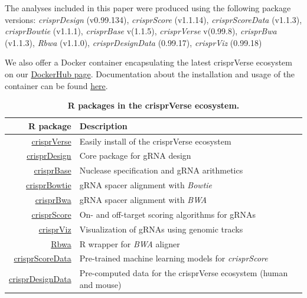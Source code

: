 \documentclass[pdftex,english,10pt]{article}
\begin{document}
{The analyses included in this paper were produced using the following package versions: 
\textit{crisprDesign} (v0.99.134),
\textit{crisprScore} (v1.1.14), 
\textit{crisprScoreData} (v1.1.3), 
\textit{crisprBowtie} (v1.1.1),
\textit{crisprBase} v(1.1.5),
\textit{crisprVerse} v(0.99.8),
\textit{crisprBwa} (v1.1.3), 
\textit{Rbwa} (v1.1.0),
\textit{crisprDesignData} (0.99.17),
\textit{crisprViz} (0.99.18)

We also offer a Docker container encapsulating the latest crisprVerse ecosystem on our \href{https://hub.docker.com/repository/docker/fortin946/crisprverse}{DockerHub page}.
Documentation about the installation and usage of the container can be found \href{https://github.com/crisprVerse/Docker}{here}.



\begin{table}
\centering
\begin{tabular}{r|l}
R package  & Description  \\ \hline
\href{https://github.com/crisprVerse/crisprVerse}{crisprVerse} &  Easily install of the crisprVerse ecosystem  \\
\href{https://github.com/crisprVerse/crisprDesign}{crisprDesign}  &  Core package for gRNA design  \\
\href{https://github.com/crisprVerse/crisprBase}{crisprBase}   &Nuclease specification and gRNA arithmetics  \\
\href{https://github.com/crisprVerse/crisprBowtie}{crisprBowtie}   & gRNA spacer alignment with \textit{Bowtie}  \\
\href{https://github.com/crisprVerse/crisprBwa}{crisprBwa}   &gRNA spacer alignment with \textit{BWA}   \\
\href{https://github.com/crisprVerse/crisprScore}{crisprScore}  & On- and off-target scoring algorithms for gRNAs \\
\href{https://github.com/crisprVerse/crisprViz}{crisprViz} & Visualization of  gRNAs using genomic tracks   \\
\href{https://github.com/crisprVerse/Rbwa}{Rbwa}  &R wrapper for \textit{BWA} aligner \\
\href{https://github.com/crisprVerse/crisprScoreData}{crisprScoreData}   &Pre-trained machine learning models for \textit{crisprScore}  \\
\href{https://github.com/crisprVerse/crisprDesignData}{crisprDesignData}  &  Pre-computed data for the crisprVerse ecosystem (human and mouse)  \\
\end{tabular}
\caption{\textbf{R packages in the crisprVerse ecosystem.}}
\label{tab:software}
\end{table}





}
\end{document}
